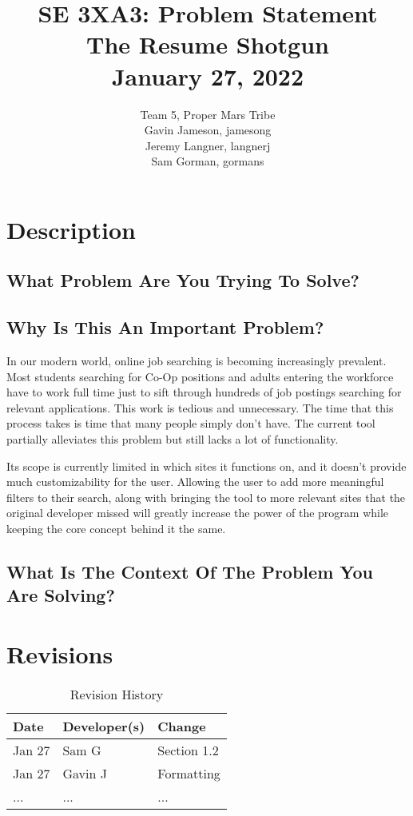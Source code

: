 \documentclass{article}
\title{SE 3XA3: Problem Statement\\The Resume Shotgun\\January 27, 2022}
\author{Team 5, Proper Mars Tribe
		\\ Gavin Jameson, jamesong
		\\ Jeremy Langner, langnerj
		\\ Sam Gorman, gormans
}
\date{}
\begin{document}
\maketitle

\newpage

\tableofcontents

\newpage

\section{Description}

\subsection{What Problem Are You Trying To Solve?}

\subsection{Why Is This An Important Problem?}
In our modern world, online job searching is becoming increasingly prevalent. 
Most students searching for Co-Op positions and adults entering the workforce have to work full time 
just to sift through hundreds of job postings searching for relevant applications. This work is tedious 
and unnecessary. The time that this process takes is time that many people simply don’t have.
The current tool partially alleviates this problem but still lacks a lot of functionality. 

Its scope is currently limited in which sites it functions on, and it doesn’t provide much 
customizability for the user. Allowing the user to add more meaningful filters to their search, 
along with bringing the tool to more relevant sites that the original developer missed will 
greatly increase the power of the program while keeping the core concept behind it the same.

\subsection{What Is The Context Of The Problem You Are Solving?}

\section{Revisions}

\begin{table}[hp]
\caption{Revision History} \label{TblRevisionHistory}
\begin{tabularx}{\textwidth}{llX}
\toprule
\textbf{Date} & \textbf{Developer(s)} & \textbf{Change}\\
\midrule
Jan 27 & Sam G & Section 1.2\\
Jan 27 & Gavin J & Formatting\\
... & ... & ...\\
\bottomrule
\end{tabularx}
\end{table}



\iffalse
\wss{comment}
\ds{comment}
\mj{comment}
\cm{comment}
\mh{comment}
\fi
\end{document}
